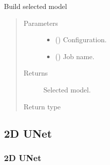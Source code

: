 \documentclass[letterpaper,10pt,english]{sphinxmanual}
\begin{document}
\begin{fulllineitems}
\label{\detokenize{models/init:models.build_model}}
Build selected model
\begin{quote}\begin{description}
\item[{Parameters}] \leavevmode\begin{itemize}
\item {} 
 () \textendash{} Configuration.

\item {} 
 () \textendash{} Job name.

\end{itemize}

\item[{Returns}] \leavevmode
{} \textendash{} Selected model.

\item[{Return type}] \leavevmode
{}

\end{description}\end{quote}

\end{fulllineitems}



\subsection{2D U\sphinxhyphen{}Net}
\label{\detokenize{models/unet2d:d-u-net}}\label{\detokenize{models/unet2d::doc}}

\subsubsection{2D U\sphinxhyphen{}Net}
\label{\detokenize{models/unet:module-models.unet}}\label{\detokenize{models/unet:d-u-net}}\label{\detokenize{models/unet::doc}}
\end{document}
